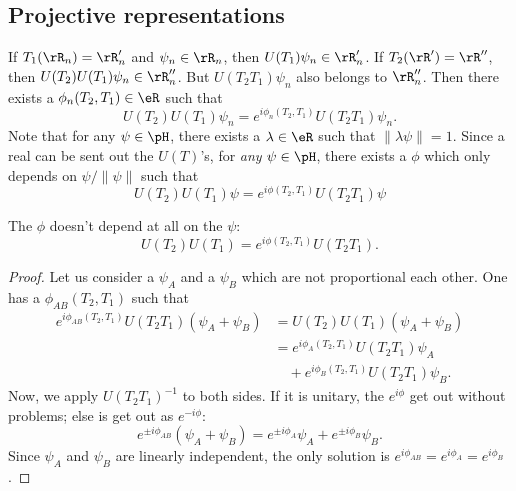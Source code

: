 \subsection{Projective representations}

If $T_1(\rR_n)=\rR_n'$ and $\psi_n\in\rR_n$, then $U(T_1)\psi_n\in\rR_n'$. If $T_2(\rR')=\rR''$, then $U(T_2)U(T_1)\psi_n\in\rR_n''$. But $U(T_2T_1)\psi_n$ also belongs to $\rR_n''$. Then there exists a $\phi_n(T_2,T_1)\in\eR$ such that
\[
	U(T_2)U(T_1)\psi_n=e^{i\phi_n(T_2,T_1)}U(T_2T_1)\psi_n.
\]
Note that for any $\psi\in \pH$, there exists a $\lambda\in\eR$ such that $\|\lambda\psi\|=1$. Since a real can be sent out the $U(T)$'s, for \emph{any} $\psi\in \pH$, there exists a $\phi$ which only depends on $\psi/\|\psi\|$ such that
\begin{equation}
	U(T_2)U(T_1)\psi=e^{i\phi(T_2,T_1)}U(T_2T_1)\psi
\end{equation}

\begin{proposition}
	The $\phi$ doesn't depend at all on the $\psi$:
	\begin{equation}
		U(T_2)U(T_1)=e^{i\phi(T_2,T_1)}U(T_2T_1).
	\end{equation}
\end{proposition}

\begin{proof}
	Let us consider a $\psi_A$ and a $\psi_B$ which are not proportional each other. One has a $\phi_{AB}(T_2,T_1)$ such that
	\begin{equation}
		\begin{split}
			e^{i\phi_{AB}(T_2,T_1)}U(T_2T_1)(\psi_A+\psi_B)&=U(T_2)U(T_1)(\psi_A+\psi_B)\\
			&=e^{i\phi_A(T_2,T_1)}U(T_2T_1)\psi_A\\
			&\quad +e^{i\phi_B(T_2,T_1)}U(T_2T_1)\psi_B.
		\end{split}
	\end{equation}
	Now, we apply $U(T_2T_1)^{-1}$ to both sides. If it is unitary, the $e^{i\phi}$ get out without problems; else is get out as $e^{-i\phi}$:
	\begin{equation}
		e^{\pm i\phi_{AB}}(\psi_A+\psi_B)=e^{\pm i\phi_A}\psi_A+e^{\pm i\phi_B}\psi_B.
	\end{equation}
	Since $\psi_A$ and $\psi_B$ are linearly independent, the only solution is $e^{i\phi_{AB}}=e^{i\phi_A}=e^{i\phi_B}$.

\end{proof}

